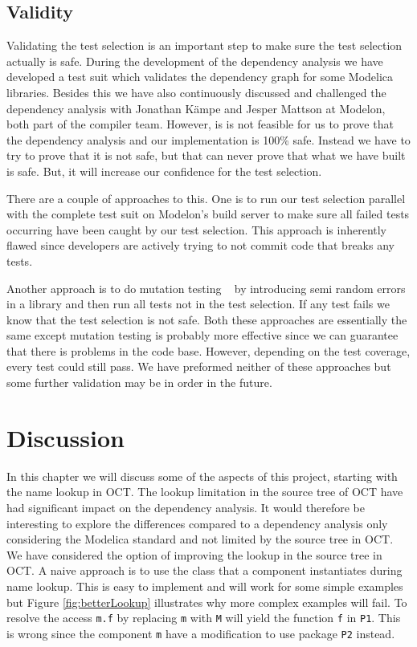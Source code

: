 \documentclass{cslthse-msc}
\begin{document}
\section{Validity}
Validating the test selection is an important step to make sure the test selection actually is safe. During the development of the dependency analysis we have developed a test suit which validates the dependency graph for some Modelica libraries. Besides this we have also continuously discussed and challenged the dependency analysis with Jonathan Kämpe and Jesper Mattson at Modelon, both part of the compiler team. However, is is not feasible for us to prove that the dependency analysis and our implementation is 100\% safe. Instead we have to try to prove that it is not safe, but that can never prove that what we have built is safe. But, it will increase our confidence for the test selection. 

There are a couple of approaches to this. One is to run our test selection parallel with the complete test suit on Modelon's build server to make sure all failed tests occurring have been caught by our test selection. This approach is inherently flawed since developers are actively trying to not commit code that breaks any tests.

Another approach is to do mutation testing ~\cite{DBLP:journals/tse/JiaH11} by introducing semi random errors in a library and then run all tests not in the test selection. If any test fails we know that the test selection is not safe. Both these approaches are essentially the same except mutation testing is probably more effective since we can guarantee that there is problems in the code base. However, depending on the test coverage, every test could still pass. We have preformed neither of these approaches but some further validation may be in order in the future.
\chapter[Discussion]{Discussion}

In this chapter we will discuss some of the aspects of this project, starting with the name lookup in OCT. The lookup limitation in the source tree of OCT have had significant impact on the dependency analysis. It would therefore be interesting to explore the differences compared to a dependency analysis only considering the Modelica standard and not limited by the source tree in OCT. We have considered the option of improving the lookup in the source tree in OCT. A naive approach is to use the class that a component instantiates during name lookup. This is easy to implement and will work for some simple examples but Figure \ref{fig:betterLookup} illustrates why more complex examples will fail. To resolve the access \texttt{m.f} by replacing \texttt{m} with \texttt{M} will yield the function \texttt{f} in \texttt{P1}. This is wrong since the component \texttt{m} have a modification to use package \texttt{P2} instead.
\end{document}
